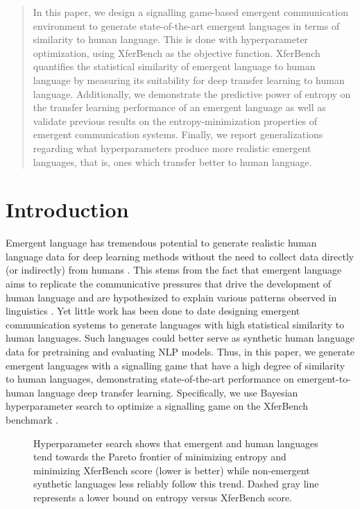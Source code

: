 \begin{abstract}
In this paper, we design a signalling game-based emergent communication environment to generate state-of-the-art emergent languages in terms of similarity to human language.
This is done with hyperparameter optimization, using XferBench as the objective function.
XferBench quantifies the statistical similarity of emergent language to human language by measuring its suitability for deep transfer learning to human language.
Additionally, we demonstrate the predictive power of entropy on the transfer learning performance of an emergent language as well as validate previous results on the entropy-minimization properties of emergent communication systems.
Finally, we report generalizations regarding what hyperparameters produce more realistic emergent languages, that is, ones which transfer better to human language.
\end{abstract}

\section{Introduction}


Emergent language has tremendous potential to generate realistic human language data for deep learning methods without the need to collect data directly (or indirectly) from humans \citep{boldt2024review}.
This stems from the fact that emergent language aims to replicate the communicative pressures that drive the development of human language and are hypothesized to explain various patterns observed in linguistics \citep{sep-linguistics}.
Yet little work has been done to date designing emergent communication systems to generate languages with high statistical similarity to human languages.
Such languages could better serve as synthetic human language data for pretraining and evaluating NLP models.
Thus, in this paper, we generate emergent languages with a signalling game that have a high degree of similarity to human languages, demonstrating state-of-the-art performance on emergent-to-human language deep transfer learning.
Specifically, we use Bayesian hyperparameter search to optimize a signalling game on the XferBench benchmark \citep{boldt-mortensen-2024-xferbench}.

\begin{figure}
  \centering
  \caption{Hyperparameter search shows that emergent and human languages tend towards the Pareto frontier of minimizing entropy and minimizing XferBench score (lower is better) while non-emergent synthetic languages less reliably follow this trend.  Dashed gray line represents a lower bound on entropy versus XferBench score.}
  \unskip\label{hpo:fig:ent-xb}
\end{figure}

